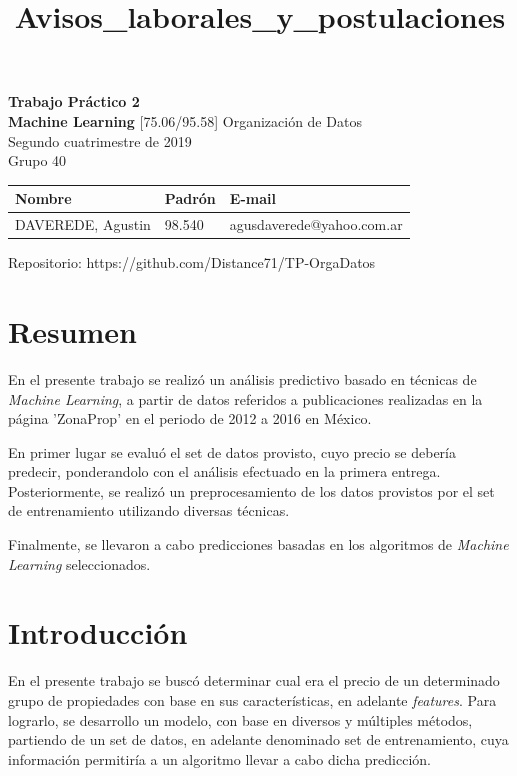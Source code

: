 \documentclass[titlepage,a4paper,11pt]{article}
\title{Avisos\_laborales\_y\_postulaciones}
\begin{document}
\begin{titlepage}
    \hfill{}
    \centering
    \vfill
    \Huge \textbf{Trabajo Práctico 2 \\ Machine Learning}
    \vskip2cm
    \Large [75.06/95.58] Organización de Datos\\
    Segundo cuatrimestre de 2019\\
    Grupo 40
    \vskip5cm
    \normalsize \begin{tabular}{  l  l  l }
      Nombre & Padrón & E-mail \\ \hline
      DAVEREDE, Agustin & 98.540 & agusdaverede@yahoo.com.ar \\
  	\end{tabular}
    \vfill
    Repositorio: https://github.com/Distance71/TP-OrgaDatos
    \vfill
\end{titlepage}
    
\tableofcontents %
\newpage

\hypertarget{introducciuxf3n}{%
\section{Resumen}\label{introducciuxf3n}}
En el presente trabajo se realizó un análisis predictivo basado en técnicas de \textit{Machine Learning}, a partir de datos referidos a publicaciones realizadas en la página 'ZonaProp' en el periodo de 2012 a 2016 en México.

En primer lugar se evaluó el set de datos provisto, cuyo precio se debería predecir, ponderandolo con el análisis efectuado en la primera entrega. Posteriormente, se realizó un preprocesamiento de los datos provistos por el set de entrenamiento utilizando diversas técnicas.

Finalmente, se llevaron a cabo predicciones basadas en los algoritmos de \textit{Machine Learning} seleccionados.

\section{Introducción}
En el presente trabajo se buscó determinar cual era el precio de un determinado grupo de propiedades con base en sus características, en adelante \textit{features}. Para lograrlo, se desarrollo un modelo, con base en diversos y múltiples métodos, partiendo de un set de datos, en adelante denominado set de entrenamiento, cuya información permitiría a un algoritmo llevar a cabo dicha predicción.
\end{document}
